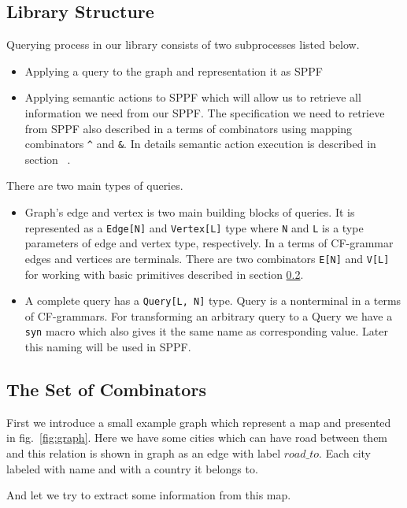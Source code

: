 \subsection{Library Structure}

Querying process in our library consists of two subprocesses listed below.
\begin{itemize}
\item Applying a query to the graph and representation it as SPPF
\item Applying semantic actions to SPPF which will allow us to retrieve all information we need from our SPPF. 
The specification we need to retrieve from SPPF also described in a terms of combinators using mapping combinators \lstinline{^} and \lstinline{&}.
In details semantic action execution is described in section~\label{sec:semanticActions} .
\end{itemize}

There are two main types of queries.
\begin{itemize}
\item Graph's edge and vertex is two main building blocks of queries. 
It is represented as a \lstinline{Edge[N]} and \lstinline{Vertex[L]} type where \lstinline{N} and \lstinline{L} is a type parameters of edge and vertex type, respectively. 
In a terms of CF-grammar edges and vertices are terminals.
There are two combinators \lstinline{E[N]} and \lstinline{V[L]} for working with basic primitives described in section \ref{sec:combinators}.
\item A complete query has a \lstinline{Query[L, N]} type.
Query is a nonterminal in a terms of CF-grammars.
For transforming an arbitrary query to a Query we have a \lstinline{syn} macro which also gives it the same name as corresponding value.
Later this naming will be used in SPPF.
\end{itemize}

\subsection{The Set of Combinators}
\label{sec:combinators}

First we introduce a small example graph which represent a map and presented in fig.~\ref{fig:graph}.
Here we have some cities which can have road between them and this relation is shown in graph as an edge with label $road\_to$.
Each city labeled with name and with a country it belongs to.

And let we try to extract some information from this map.

